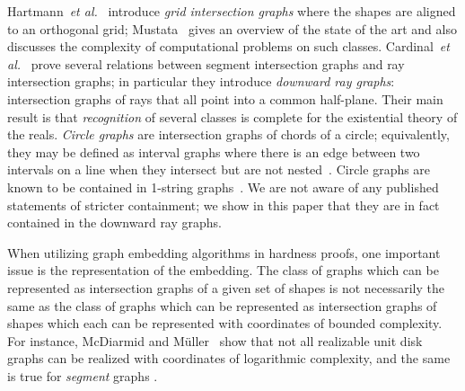 \documentclass[]{llncs}
\newcommand{\etal}{{\it et al.\xspace}}
\begin{document}
Hartmann~\etal~\cite {hart} introduce {\em grid intersection graphs} where the shapes are aligned to an orthogonal grid; Mustata~\cite {11303_4499} gives an overview of the state of the art and also discusses the complexity of computational problems on such classes.
Cardinal~\etal~\cite {JGAA-470} prove several relations between segment intersection graphs and ray intersection graphs; in particular they introduce {\em downward ray graphs}: intersection graphs of rays that all point into a common half-plane. Their main result is that {\em recognition} of several classes is complete for the existential theory of the reals.
%
{\em Circle graphs} are intersection graphs of chords of a circle; equivalently, they may be defined as interval graphs where there is an edge between two intervals on a line when they intersect but are not nested~\cite {zbMATH03859178}.
Circle graphs are known to be contained in 1-string graphs~\cite {10.5555/1283383.1283449}. We are not aware of any published statements of stricter containment; we show in this paper that they are in fact contained in the downward ray graphs.


When utilizing graph embedding algorithms in hardness proofs, one important issue is the representation of the embedding. 
The class of graphs which can be represented as intersection graphs of a given set of shapes is not necessarily the same as the class of graphs which can be represented as intersection graphs of shapes which each can be represented with coordinates of bounded complexity.
      For instance, McDiarmid and M{\"uller}~\cite {mdm-irdsg-13} show that not all realizable unit disk graphs can be realized with coordinates of logarithmic complexity, and the same is true for {\em segment} graphs \cite{km-igs-94}.
\end{document}
